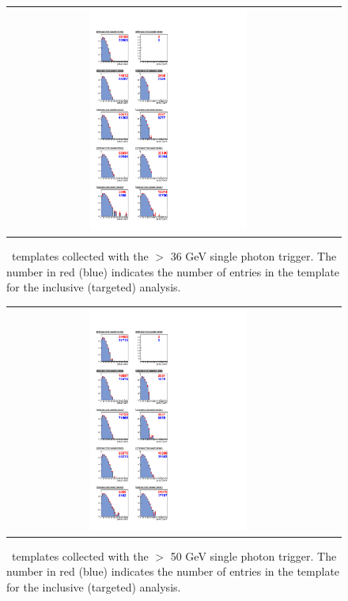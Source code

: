 \begin{figure}[!h]
\begin{center}
\begin{tabular}{cc}
\includegraphics[width=0.5\textwidth]{plots/template_targeted_1_19fb.pdf}
\end{tabular}
\caption{
\MET\ templates collected with the \pt $>$ 36 GeV single photon trigger.
The number in red (blue) indicates the number of entries in the template for the inclusive (targeted) analysis.
}
\end{center}
\end{figure}

\clearpage

\begin{figure}[!h]
\begin{center}
\begin{tabular}{cc}
\includegraphics[width=0.5\textwidth]{plots/template_targeted_2_19fb.pdf}
\end{tabular}
\caption{
\MET\ templates collected with the \pt $>$ 50 GeV single photon trigger.
The number in red (blue) indicates the number of entries in the template for the inclusive (targeted) analysis.
}
\end{center}
\end{figure}

